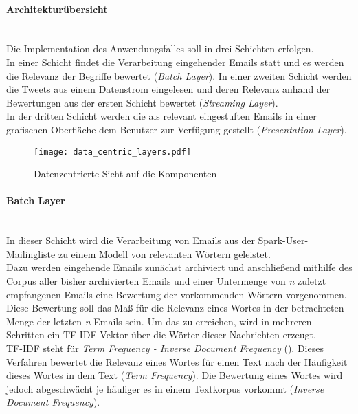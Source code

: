 \paragraph{Architekturübersicht}\\

Die Implementation des Anwendungsfalles soll in drei Schichten erfolgen. \\
In einer Schicht findet die Verarbeitung eingehender Emails statt und es werden die Relevanz der Begriffe bewertet (\textit{Batch Layer}).
In einer zweiten Schicht werden die Tweets aus einem Datenstrom eingelesen und deren Relevanz anhand der Bewertungen aus der ersten Schicht bewertet (\textit{Streaming Layer}).\\
In der dritten Schicht werden die als relevant eingestuften Emails in einer grafischen Oberfläche dem Benutzer zur Verfügung gestellt (\textit{Presentation Layer}).

\begin{figure}[ht!]
	\centering
  \texttt{[image: data\_centric\_layers.pdf]}
	\caption{Datenzentrierte Sicht auf die Komponenten}
	\label{figure:data_centric_layers}
\end{figure}

\paragraph{Batch Layer}\\

In dieser Schicht wird die Verarbeitung von Emails aus der Spark-User-Mailingliste zu einem Modell von relevanten Wörtern geleistet.\\

Dazu werden eingehende Emails zunächst archiviert und anschließend mithilfe des Corpus aller bisher archivierten Emails und einer Untermenge von \textit{n} zuletzt empfangenen Emails eine Bewertung der vorkommenden Wörtern vorgenommen.\\

Diese Bewertung soll das Maß für die Relevanz eines Wortes in der betrachteten Menge der letzten \textit{n} Emails sein. Um das zu erreichen, wird in mehreren Schritten ein TF-IDF Vektor über die Wörter dieser Nachrichten erzeugt.\\

TF-IDF steht für \textit{Term Frequency - Inverse Document Frequency} (\cite{SparckJones:1988:SIT:106765.106782}). Dieses Verfahren bewertet die Relevanz eines Wortes für einen Text nach der Häufigkeit dieses Wortes in dem Text (\textit{Term Frequency}). Die Bewertung eines Wortes wird jedoch abgeschwächt je häufiger es in einem Textkorpus vorkommt (\textit{Inverse Document Frequency}).\\

